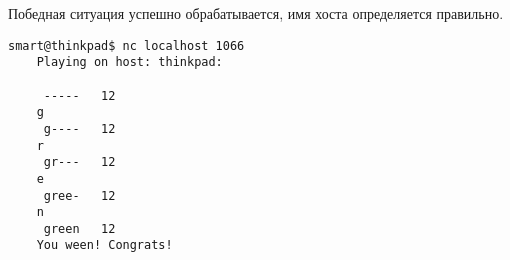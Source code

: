 Победная ситуация успешно обрабатывается, имя хоста определяется правильно.
\begin{Verbatim}[frame=single]
    smart@thinkpad$ nc localhost 1066
    Playing on host: thinkpad:
    
     -----   12
    g
     g----   12
    r
     gr---   12
    e
     gree-   12
    n
     green   12
    You ween! Congrats!
\end{Verbatim}